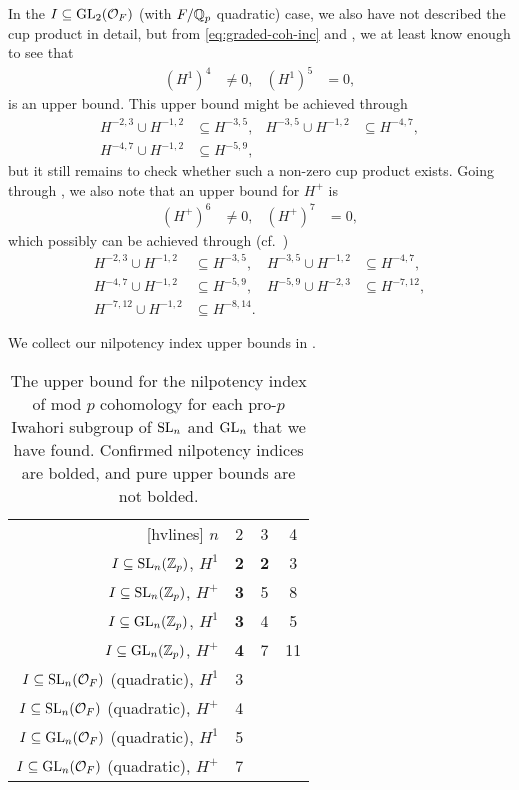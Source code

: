 In the $I \subseteq \operatorname{GL}_{2}(\mathcal{O}_{F})$ (with $F/\mathbb{Q}_{p}$ quadratic) case, we also have not described the cup product in detail, but from \eqref{eq:graded-coh-inc} and , we at least know enough to see that
\begin{align*}
  (H^{1})^{4} &\neq 0, & (H^{1})^{5} &= 0,
\end{align*}
is an upper bound. This upper bound might be achieved through
\begin{align*}
  H^{-2,3} \cup H^{-1,2} &\subseteq H^{-3,5}, & H^{-3,5} \cup H^{-1,2} &\subseteq H^{-4,7}, \\
  H^{-4,7} \cup H^{-1,2} &\subseteq H^{-5,9},
\end{align*}
but it still remains to check whether such a non-zero cup product exists. Going through , we also note that an upper bound for $H^{+}$ is
\begin{align*}
  (H^{+})^{6} &\neq 0, & (H^{+})^{7} &= 0,
\end{align*}
which possibly can be achieved through (cf.\ \cite{code})
\begin{align*}
  H^{-2,3} \cup H^{-1,2} &\subseteq H^{-3,5}, & H^{-3,5} \cup H^{-1,2} &\subseteq H^{-4,7}, \\
  H^{-4,7} \cup H^{-1,2} &\subseteq H^{-5,9}, & H^{-5,9} \cup H^{-2,3} &\subseteq H^{-7,12}, \\
  H^{-7,12} \cup H^{-1,2} &\subseteq H^{-8,14}.
\end{align*}

We collect our nilpotency index upper bounds in .

\begin{table}[ht]
  \centering
  \caption[Nilpotency index upper bounds for mod $p$ cohomology of pro-$p$ Iwahori subgroups]{The upper bound for the nilpotency index of mod $p$ cohomology for each pro-$p$ Iwahori subgroup of $\operatorname{SL}_{n}$ and $\operatorname{GL}_{n}$ that we have found. Confirmed nilpotency indices are bolded, and pure upper bounds are not bolded.}
  \label{tab:nilp-ind}
  \begin{NiceTabular}{rccc}[hvlines]
    $n$ & 2 & 3 & 4 \\
    $I \subseteq \operatorname{SL}_{n}(\mathbb{Z}_{p})$, $H^{1}$ & \textbf{2} & \textbf{2} & 3 \\
    $I \subseteq \operatorname{SL}_{n}(\mathbb{Z}_{p})$, $H^{+}$ & \textbf{3} & 5 & 8  \\
    $I \subseteq \operatorname{GL}_{n}(\mathbb{Z}_{p})$, $H^{1}$ & \textbf{3} & 4 & 5 \\
    $I \subseteq \operatorname{GL}_{n}(\mathbb{Z}_{p})$, $H^{+}$ & \textbf{4} & 7 & 11 \\
    $I \subseteq \operatorname{SL}_{n}(\mathcal{O}_{F})$ (quadratic), $H^{1}$ & 3 \\
    $I \subseteq \operatorname{SL}_{n}(\mathcal{O}_{F})$ (quadratic), $H^{+}$ & 4 \\
    $I \subseteq \operatorname{GL}_{n}(\mathcal{O}_{F})$ (quadratic), $H^{1}$ & 5 \\
    $I \subseteq \operatorname{GL}_{n}(\mathcal{O}_{F})$ (quadratic), $H^{+}$ & 7
  \end{NiceTabular}
\end{table}


